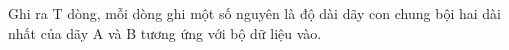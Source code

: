 Ghi ra T dòng, mỗi dòng ghi một số nguyên là độ dài dãy con chung bội hai dài nhất của dãy A và B tương ứng với bộ dữ liệu vào.